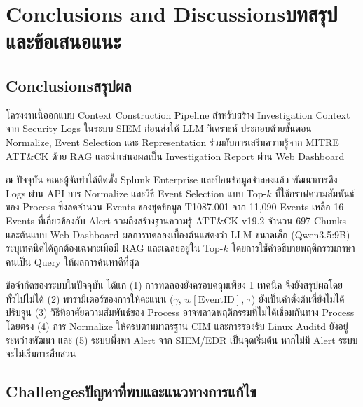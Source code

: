 \chapter{\ifenglish Conclusions and Discussions\else บทสรุปและข้อเสนอแนะ\fi}

\section{\ifenglish Conclusions\else สรุปผล\fi}

โครงงานนี้ออกแบบ Context Construction Pipeline สำหรับสร้าง Investigation Context จาก Security Logs ในระบบ SIEM
ก่อนส่งให้ LLM วิเคราะห์ ประกอบด้วยขั้นตอน Normalize, Event Selection และ Representation
ร่วมกับการเสริมความรู้จาก MITRE ATT\&CK ด้วย RAG และนำเสนอผลเป็น Investigation Report ผ่าน Web Dashboard

ณ ปัจจุบัน คณะผู้จัดทำได้ติดตั้ง Splunk Enterprise และป้อนข้อมูลจำลองแล้ว
พัฒนาการดึง Logs ผ่าน API การ Normalize และวิธี Event Selection แบบ Top-$k$ ที่ใช้กราฟความสัมพันธ์ของ Process
ซึ่งลดจำนวน Events ของชุดข้อมูล T1087.001 จาก 11,090 Events เหลือ 16 Events ที่เกี่ยวข้องกับ Alert
รวมถึงสร้างฐานความรู้ ATT\&CK v19.2 จำนวน 697 Chunks และต้นแบบ Web Dashboard
ผลการทดลองเบื้องต้นแสดงว่า LLM ขนาดเล็ก (Qwen3.5:9B) ระบุเทคนิคได้ถูกต้องเฉพาะเมื่อมี RAG
และเฉลยอยู่ใน Top-$k$ โดยการใช้คำอธิบายพฤติกรรมภาษาคนเป็น Query ให้ผลการค้นหาดีที่สุด

ข้อจำกัดของระบบในปัจจุบัน ได้แก่
(1) การทดลองยังครอบคลุมเพียง 1 เทคนิค จึงยังสรุปผลโดยทั่วไปไม่ได้
(2) พารามิเตอร์ของการให้คะแนน ($\gamma$, $w[\mathrm{EventID}]$, $\tau$) ยังเป็นค่าตั้งต้นที่ยังไม่ได้ปรับจูน
(3) วิธีที่อาศัยความสัมพันธ์ของ Process อาจพลาดพฤติกรรมที่ไม่ได้เชื่อมกันทาง Process โดยตรง
(4) การ Normalize ให้ครบตามมาตรฐาน CIM และการรองรับ Linux Auditd ยังอยู่ระหว่างพัฒนา
และ (5) ระบบพึ่งพา Alert จาก SIEM/EDR เป็นจุดเริ่มต้น หากไม่มี Alert ระบบจะไม่เริ่มการสืบสวน

\section{\ifenglish Challenges\else ปัญหาที่พบและแนวทางการแก้ไข\fi}

